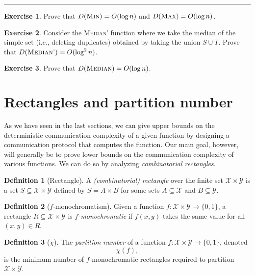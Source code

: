 \documentclass[11pt,oneside]{book}
\theoremstyle{plain}
\theoremstyle{definition}
\newtheorem{definition}{Definition}
\newtheorem{exercise}{Exercise}
\theoremstyle{plain}
\newcommand{\calX}{\mathcal{X}}
\newcommand{\calY}{\mathcal{Y}}
\newcommand{\exercises}{\bigskip \noindent\rule{8cm}{0.4pt} \medskip}
\begin{document}
\exercises

\begin{exercise} %
	Prove that $D(\textsc{Min}) = O(\log n)$ and $D(\textsc{Max}) = O(\log n)$.
\end{exercise}

\begin{exercise}
	Consider the \textsc{Median'} function where we take the median of the simple set (i.e., deleting duplicates) obtained by taking the union $S \cup T$. 
	Prove that $D(\textsc{Median'}) = O(\log^2 n)$.
\end{exercise}

\begin{exercise} %
	Prove that $D(\textsc{Median}) = O(\log n)$.
\end{exercise}


\section{Rectangles and partition number}

As we have seen in the last sections, we can give upper bounds on the deterministic communication complexity of a given function by designing a communication protocol that computes the function. Our main goal, however, will generally be to prove lower bounds on the communication complexity of various functions. We can do so by analyzing \emph{combinatorial rectangles}.

\begin{definition}[Rectangle]
	A \emph{(combinatorial) rectangle} over the finite set $\calX \times \calY$ is a set $S \subseteq \calX \times \calY$ defined by $S = A \times B$ for some sets $A \subseteq \calX$ and $B \subseteq \calY$.
\end{definition}

\begin{definition}[$f$-monochromatism]
	Given a function $f : \calX \times \calY \to \{0,1\}$, a rectangle $R \subseteq \calX \times \calY$ is \emph{$f$-monochromatic} if $f(x,y)$ takes the same value for all $(x,y) \in R$.
\end{definition}

\begin{definition}[$\chi$]
	The \emph{partition number} of a function $f : \calX \times \calY \to \{0,1\}$, denoted
	\[
	\chi(f),
	\]
	is the minimum number of $f$-monochromatic rectangles required to partition $\calX \times \calY$.
\end{definition}
\end{document}
